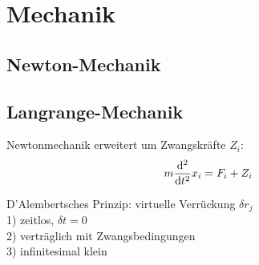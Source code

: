 \chapter{Mechanik}
  \section{Newton-Mechanik}
  \section{Langrange-Mechanik}
    Newtonmechanik erweitert um Zwangskräfte $Z_i$:
    \begin{equation}
      m \frac{\mathrm{d}^2}{\mathrm{d} t^2} x_i = F_i + Z_i
    \end{equation}

    D'Alembertsches Prinzip:
    virtuelle Verrückung $\delta r_j$ \\
    1) zeitlos, $\delta t=0$ \\
    2) verträglich mit Zwangsbedingungen \\
    3) infinitesimal klein 

